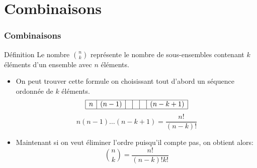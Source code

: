 \documentclass{beamer}
\begin{document}
\section{Combinaisons}
\begin{frame}[t]
  \frametitle{Combinaisons}
 \begin{block}{Définition}
   \small
   Le nombre \alert{$\binom{n}{k}$} représente le nombre de sous-ensembles contenant $k$
   éléments d'un ensemble avec $n$ éléments.
 \end{block} 
\pause
 \begin{itemize}
   \scriptsize
   \item  On peut trouver cette formule on choisissant tout d'abord un séquence
     ordonnée de $k$ éléments.
     $$
     \begin{array}{|c|c|c|c|c|c|}
       \hline
       n & (n-1) &  & &  & (n-k + 1)\\
       \hline
     \end{array}
     $$
     \pause
  \begin{equation*}
    n(n-1)\ldots (n-k + 1) = \dfrac{n!}{(n-k)!}
  \end{equation*}
  \vspace*{1cm}
\item Maintenant si on veut éliminer l'ordre puisqu'il compte pas, on obtient
  alors:
  \begin{equation}
    \binom{n}{k} = \dfrac{n!}{(n-k)!k!}
  \end{equation}
 \end{itemize}
\end{frame}
\end{document}
